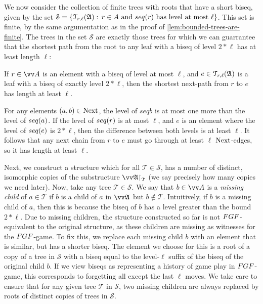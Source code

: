 \noindent
We now consider the collection of finite trees with roots that have a short biseq, given by the set $\mathcal{S} = \left\{ \mathcal{T}_{r,\ell}(\str{A}):\, r \in A \text{ and } \seq{r}\ \text{has level at most $\ell$}\right\}$.
This set is finite, by the same argumentation as in the proof of \cref{lem:bounded-trees-are-finite}.
The trees in the set $\mathcal{S}$ are exactly those trees for which we can guarrantee that the shortest path from the root to any leaf with a biseq of level $2 * \ell$ has at least length $\ell$:
\begin{lemma}\label{lem:bounded-trees-shortest-next-path}
  If $r \in \unraveldom{A}$ is an element with a biseq of level at most $\ell$, and $e \in \mathcal{T}_{r,\ell}({\mathfrak{A}})$ is a leaf with a biseq of exactly level $2 * \ell$, then the shortest next-path from $r$ to $e$ has length at least $\ell$.
\end{lemma}
\begin{proofsketch}
  For any elements $(a,b) \in \mathrm{Next}$, the level of $seq{b}$ is at most one more than the level of $\seq{a}$.
  If the level of $\seq{r}$ is at most $\ell$, and $e$ is an element where the level of $\seq{e}$ is $2 * \ell$, then the difference between both levels is at least $\ell$.
  It follows that any next chain from $r$ to $e$ must go through at least $\ell$ $\mathrm{Next}$-edges, so it has length at least $\ell$.
\end{proofsketch}
Next, we construct a structure which for all $\mathcal{T} \in \mathcal{S}$, has a number of distinct, isomorphic copies of the substructure $\restr{\unravel{A}}{\mathcal{T}}$ (we say precisely how many copies we need later).
Now, take any tree $\mathcal{T} \in \mathcal{S}$.
We say that $b \in \unraveldom{A}$ is a \emph{missing child} of $a \in \mathcal{T}$ if $b$ is a child of $a$ in $\unravel{A}$ but $b \notin \mathcal{T}$.
Intuitively, if $b$ is a missing child of $a$, then this is because the biseq of $b$ has a level greater than the bound $2 * \ell$.
Due to missing children, the structure constructed so far is not $\FGF$-equivalent to the original structure, as these children are missing as witnesses for the $\FGF$-game.
To fix this, we replace each missing child $b$ with an element that is similar, but has a shorter biseq.
The element we choose for this is a root of a copy of a tree in $\mathcal{S}$ with a biseq equal to the level-$\ell$ suffix of the biseq of the original child $b$.
If we view biseqs as representing a history of game play in $\FGF$-game, this corresponds to forgetting all except the last $\ell$ moves.
We take care to ensure that for any given tree $\mathcal{T}$ in $\mathcal{S}$, two missing children are always replaced by roots of distinct copies of trees in $\mathcal{S}$.

